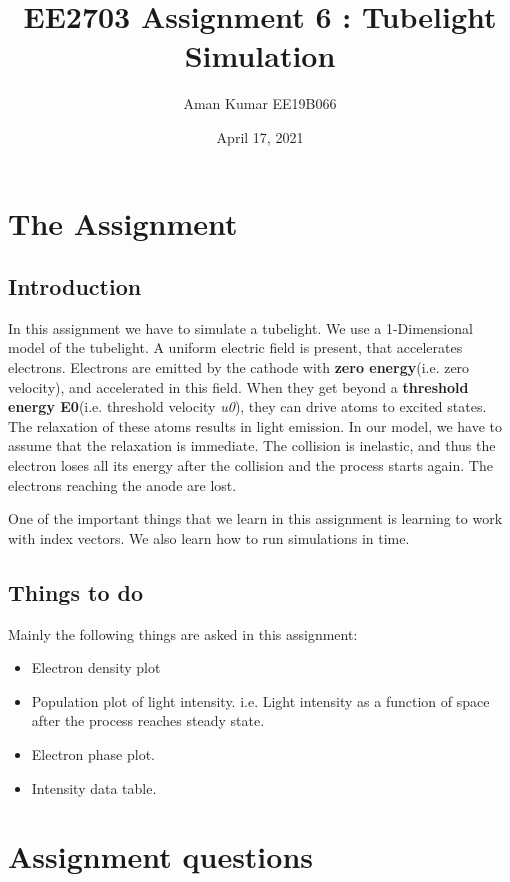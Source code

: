 \documentclass[11pt, a4paper]{article}
\title{EE2703 Assignment 6 : Tubelight Simulation}
\author{Aman Kumar EE19B066}
\date{April 17, 2021}
\begin{document}
\maketitle

\section{The Assignment}
\subsection{Introduction}
    In this assignment we have to simulate a tubelight. We use a 1-Dimensional model of the tubelight. A uniform electric field is present, that accelerates electrons. Electrons are emitted by the cathode with \textbf{zero energy}(i.e. zero velocity), and accelerated in this field. When they get beyond a \textbf{threshold energy E0}(i.e. threshold velocity \textit{u0}), they can drive atoms to excited states. The relaxation of these atoms results in light emission. In our model, we have to assume that the relaxation is immediate. The collision is inelastic, and thus the electron loses all its energy after the collision and the process starts again. The electrons reaching the anode are lost.
    
    One of the important things that we learn in this assignment is learning to work with index vectors. We also learn how to run simulations in time.
\subsection{Things to do}
    Mainly the following things are asked in this assignment:
    \begin{itemize}
        \item Electron density plot
        \item Population plot of light intensity. i.e. Light intensity as a function of space after the process reaches steady state.
        \item Electron phase plot.
        \item Intensity data table.
    \end{itemize}
\section{Assignment questions}
\end{document}
